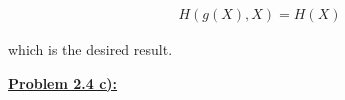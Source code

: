 \documentclass{article}[12pt]
\numberwithin{equation}{subsection}
\newcommand{\prob}[1]{\textbf{\underline{Problem #1):}}}
\begin{document}
\begin{flushleft}
\begin{align*} 
H \left( g \left( X \right), X \right) = H \left( X \right)  
\end{align*}

which is the desired result.



\vspace{0.5in}

\prob{2.4 c}  










































































































\end{flushleft}
\end{document}
